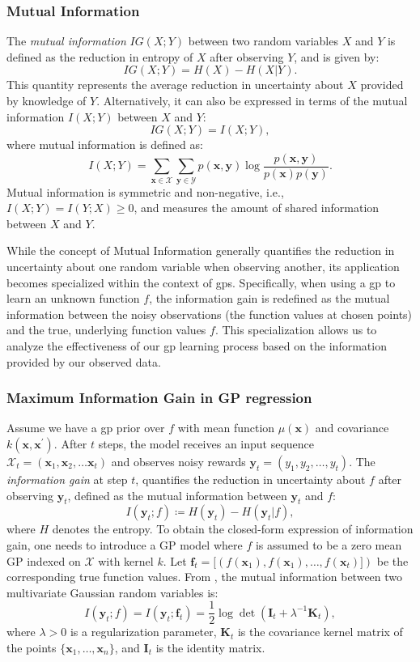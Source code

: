 \subsubsection{Mutual Information}

The \textit{mutual information} $IG(X; Y)$ between two random variables $X$ and $Y$ is defined as the reduction in entropy of $X$ after observing $Y$, and is given by:
\[
IG(X; Y) = H(X) - H(X|Y).
\]
This quantity represents the average reduction in uncertainty about $X$ provided by knowledge of $Y$. Alternatively, it can also be expressed in terms of the mutual information $I(X; Y)$ between $X$ and $Y$:
\[
IG(X; Y) = I(X; Y),
\]
where mutual information is defined as:
\[
I(X; Y) = \sum_{\mathbf{x} \in \mathcal{X}} \sum_{\mathbf{y} \in \mathcal{Y}} p(\mathbf{x}, \mathbf{y}) \log \frac{p(\mathbf{x}, \mathbf{y})}{p(\mathbf{x}) p(\mathbf{y})}.
\]
Mutual information is symmetric and non-negative, i.e., $I(X; Y) = I(Y; X) \geq 0$, and measures the amount of shared information between $X$ and $Y$.

While the concept of Mutual Information generally quantifies the reduction in uncertainty about one random variable when observing another, its application becomes specialized within the context of \acp{gp}. Specifically, when using a \ac{gp} to learn an unknown function $f$, the information gain is redefined as the mutual information between the noisy observations (the function values at chosen points) and the true, underlying function values $f$. This specialization allows us to analyze the effectiveness of our \ac{gp} learning process based on the information provided by our observed data. 
\subsubsection{Maximum Information Gain in GP regression}

Assume we have a \ac{gp} prior over \( f \) with mean function \( \mu(\mathbf{x}) \) and covariance \( k(\mathbf{x}, \mathbf{x}^\prime) \). After $t$ steps, the model receives an input sequence $\mathcal{X}_t = (\mathbf{x}_1, \mathbf{x}_2, \dots  \mathbf{x}_t)$ and observes noisy rewards $\mathbf{y}_t = (y_1, y_2, \dots, y_t)$. The \emph{information gain} at step $t$, quantifies the reduction in uncertainty about $f$ after observing $\mathbf{y}_t$, defined as the mutual information between  $\mathbf{y}_t$ and $f$:
\[
I(\mathbf{y}_t; f) \coloneqq  H(\mathbf{y}_t) - H(\mathbf{y}_t \rvert f), 
\]
where $H$ denotes the entropy. To obtain the closed-form expression of information gain, one needs to introduce a GP model where $f$ is assumed to be a zero mean GP indexed on $\mathcal X$ with kernel $k$. Let $\mathbf{f}_t = [\left(f(\mathbf{x}_1), f(\mathbf{x}_1), \dots, f(\mathbf{x}_t)] \right)$ be the corresponding true function values.  From \citet{cover1999elements}, the mutual information between two multivariate Gaussian random variables is: 
\[ I(\mathbf{y}_t; f) = I(\mathbf{y}_t; \mathbf{f}_t) = \frac{1}{2} \log \det (\mathbf{I}_t + \lambda^{-1}\mathbf{K}_t), \]
where $\lambda > 0$ is a regularization parameter, $\mathbf{K}_t$ is the covariance kernel matrix of the points \( \{\mathbf{x}_1, \dots, \mathbf{x}_n\} \),
and \( \mathbf{I}_t \) is the identity matrix.


